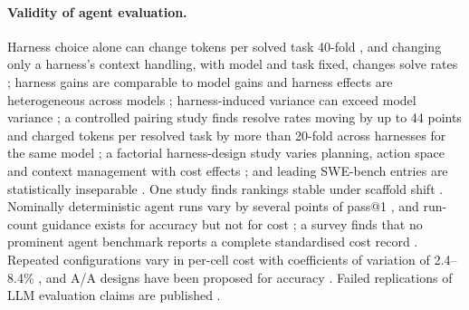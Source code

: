 \documentclass[10pt]{article}
\begin{document}
\paragraph{Validity of agent evaluation.} Harness choice alone can change tokens per solved task
40-fold \citep{vats2026scaffold}, and changing only a harness's context handling, with model and
task fixed, changes solve rates \citep{lewis2026samemodel}; harness gains are comparable to model
gains and harness effects are heterogeneous across models \citep{han2026harness}; harness-induced
variance can exceed model variance \citep{zhang2026stopcomparing}; a controlled pairing study finds
resolve rates moving by up to 44 points and charged tokens per resolved task by more than
20-fold across harnesses for the same model \citep{zhao2026pairingmatters}; a factorial harness-design
study varies planning, action space and context management with cost effects
\citep{fan2026harnessdesign}; and leading SWE-bench entries are statistically inseparable
\citep{liu2026codingagentsconverged}. One study finds rankings stable under scaffold shift
\citep{ndzomga2026efficient}. Nominally deterministic agent runs vary by several points of pass@1
\citep{bjarnason2026randomness}, and run-count guidance exists for accuracy but not for cost
\citep{blackwell2024reproducible,potamitis2025reasonbench}; a survey finds that no prominent agent
benchmark reports a complete standardised cost record \citep{nageshwaran2026survey}. Repeated
configurations vary in per-cell cost with coefficients of variation of 2.4--8.4\%
\citep{hu2026costinefficient}, and A/A designs have been proposed for accuracy
\citep{kaliyev2026noisefloor}. Failed replications of LLM evaluation claims are published
\citep{schaeffer2023emergent,mirzadeh2024gsmsymbolic,xu2026validationevidence}.
\end{document}
